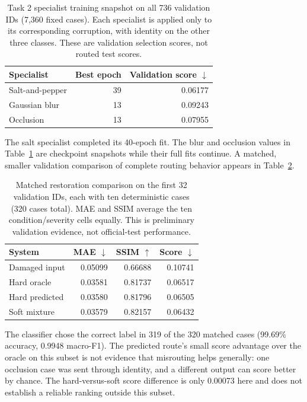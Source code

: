 \begin{table}[t]
\centering
\caption{Task 2 specialist training snapshot on all 736 validation IDs (7,360 fixed cases). Each specialist is applied only to its corresponding corruption, with identity on the other three classes. These are validation selection scores, not routed test scores.}
\label{tab:specialist-snapshot}
\begin{tabular}{lrr}
\toprule
Specialist & Best epoch & Validation score $\downarrow$ \\
\midrule
Salt-and-pepper & 39 & 0.06177 \\
Gaussian blur & 13 & 0.09243 \\
Occlusion & 13 & 0.07955 \\
\bottomrule
\end{tabular}
\end{table}

The salt specialist completed its 40-epoch fit. The blur and occlusion values in Table~\ref{tab:specialist-snapshot} are checkpoint snapshots while their full fits continue. A matched, smaller validation comparison of complete routing behavior appears in Table~\ref{tab:routing-snapshot}.

\begin{table}[t]
\centering
\caption{Matched restoration comparison on the first 32 validation IDs, each with ten deterministic cases (320 cases total). MAE and SSIM average the ten condition/severity cells equally. This is preliminary validation evidence, not official-test performance.}
\label{tab:routing-snapshot}
\begin{tabular}{lrrr}
\toprule
System & MAE $\downarrow$ & SSIM $\uparrow$ & Score $\downarrow$ \\
\midrule
Damaged input & 0.05099 & 0.66688 & 0.10741 \\
Hard oracle & 0.03581 & 0.81737 & 0.06517 \\
Hard predicted & 0.03580 & 0.81796 & 0.06505 \\
Soft mixture & 0.03579 & 0.82157 & 0.06432 \\
\bottomrule
\end{tabular}
\end{table}

The classifier chose the correct label in 319 of the 320 matched cases (99.69\% accuracy, 0.9948 macro-F1). The predicted route's small score advantage over the oracle on this subset is not evidence that misrouting helps generally: one occlusion case was sent through identity, and a different output can score better by chance. The hard-versus-soft score difference is only 0.00073 here and does not establish a reliable ranking outside this subset.

